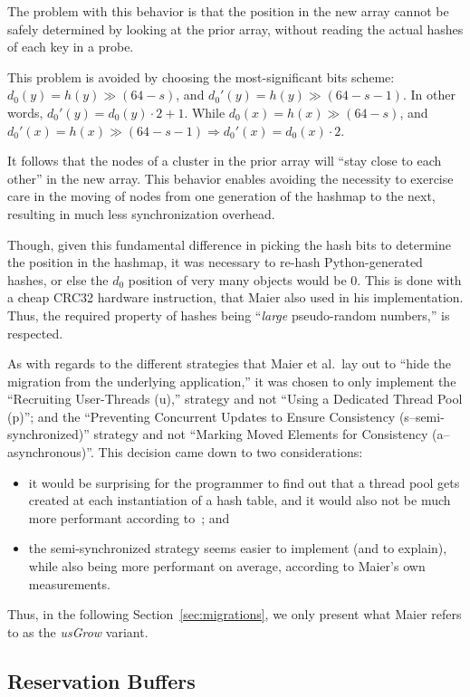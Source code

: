 The problem with this behavior is that the position in the new array cannot be safely determined by looking at the prior array, without reading the actual hashes of each key in a probe.

This problem is avoided by choosing the most-significant bits scheme: $d_0(y) = h(y) \gg (64 - s)$, and $d_0'(y) = h(y) \gg (64 - s - 1)$.
In other words, $d_0'(y) = d_0(y) \cdot 2 + 1$.
While $d_0(x) = h(x) \gg (64 - s)$, and $d_0'(x) = h(x) \gg (64 - s - 1) \Rightarrow d_0'(x) = d_0(x) \cdot 2$.

It follows that the nodes of a cluster in the prior array will ``stay close to each other'' in the new array.
This behavior enables avoiding the necessity to exercise care in the moving of nodes from one generation of the hashmap to the next, resulting in much less synchronization overhead.

Though, given this fundamental difference in picking the hash bits to determine the position in the hashmap, it was necessary to re-hash Python-generated hashes, or else the $d_0$ position of very many objects would be $0$.
This is done with a cheap CRC32 hardware instruction, that Maier also used in his implementation.
Thus, the required property of hashes being ``\emph{large} pseudo-random numbers,'' is respected.

As with regards to the different strategies that Maier et al.\ lay out to ``hide the migration from the underlying application,'' it was chosen to only implement the ``Recruiting User-Threads (u),'' strategy and not ``Using a Dedicated Thread Pool (p)''; and the ``Preventing Concurrent Updates to Ensure Consistency (s--semi-synchronized)'' strategy and not ``Marking Moved Elements for Consistency (a--asynchronous)''.
This decision came down to two considerations:
\begin{itemize}
	\item it would be surprising for the programmer to find out that a thread pool gets created at each instantiation of a hash table, and it would also not be much more performant according to~\cite[\S8.4, Using Dedicated Growing Threads]{maier}; and
	\item the semi-synchronized strategy seems easier to implement (and to explain), while also being more performant on average, according to Maier's own measurements.
\end{itemize}
Thus, in the following Section~\ref{sec:migrations}, we only present what Maier refers to as the \emph{usGrow} variant.


\subsection{Reservation Buffers}\label{subsec:reservation-buffers}

